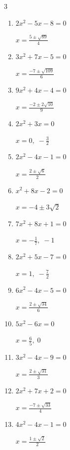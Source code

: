 \begin{multicols}{3}
\begin{enumerate}
\resetques

  \item $2x^{2}-5x-8=0$

        $\displaystyle x=\frac{5\pm \sqrt{89}}{4}$

  \item $3x^{2}+7x-5=0$

        $\displaystyle x=\frac{-7\pm \sqrt{109}}{6}$

  \item $9x^{2}+4x-4=0$

        $\displaystyle x=\frac{-2\pm 2\sqrt{10}}{9}$

  \item $2x^{2}+3x=0$

        $\displaystyle x=0, \; -\frac{3}{2}$

  \item $2x^{2}-4x-1=0$

        $\displaystyle x=\frac{2\pm \sqrt{6}}{2}$

  \item $x^{2}+8x-2=0$

        $\displaystyle x=-4\pm 3\sqrt{2}$

  \item $7x^{2}+8x+1=0$

        $\displaystyle x=-\frac{1}{7}, \; -1$

\columnbreak %

  \item $2x^{2}+5x-7=0$

        $\displaystyle x=1, \; -\frac{7}{2}$

  \item $6x^{2}-4x-5=0$

        $\displaystyle x=\frac{2\pm \sqrt{34}}{6}$

  \item $5x^{2}-6x=0$

        $\displaystyle x=\frac{6}{5}, \; 0$

  \item $3x^{2}-4x-9=0$

        $\displaystyle x=\frac{2\pm \sqrt{31}}{3}$

  \item $2x^{2}+7x+2=0$

        $\displaystyle x=\frac{-7\pm \sqrt{33}}{4}$

  \item $4x^{2}-4x-1=0$

        $\displaystyle x=\frac{1\pm \sqrt{2}}{2}$


\end{enumerate}
\end{multicols}
